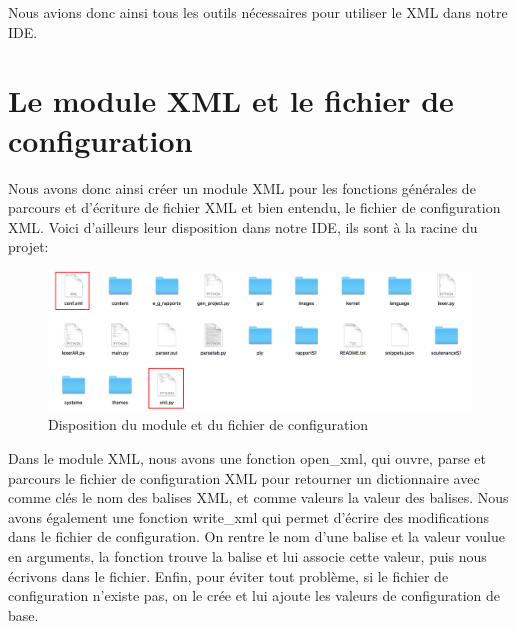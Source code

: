 \documentclass[a4paper,12pt]{article}
\begin{document}
Nous avions donc ainsi tous les outils nécessaires pour utiliser le XML dans notre IDE. 

\section{Le module XML et le fichier de configuration}

Nous avons donc ainsi créer un module XML pour les fonctions générales de parcours et d'écriture de fichier XML et bien entendu, le fichier de configuration XML. Voici d'ailleurs leur disposition dans notre IDE, ils sont à la racine du projet:

\begin{figure}[h!]
			\begin{center}
				\includegraphics[scale=0.23]{images/dossier.png}
				\caption{Disposition du module et du fichier de configuration}
			\end{center}
		\end{figure}
		
Dans le module XML, nous avons une fonction open\_xml, qui ouvre, parse et parcours le fichier de configuration XML pour retourner un dictionnaire avec comme clés le nom des balises XML, et comme valeurs la valeur des balises. Nous avons également une fonction write\_xml qui permet d'écrire des modifications dans le fichier de configuration. On rentre le nom d'une balise et la valeur voulue en arguments, la fonction trouve la balise et lui associe cette valeur, puis nous écrivons dans le fichier. Enfin, pour éviter tout problème, si le fichier de configuration n'existe pas, on le crée et lui ajoute les valeurs de configuration de base. 
\end{document}
